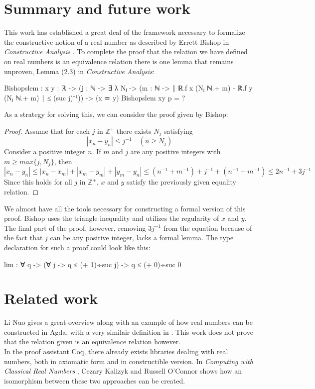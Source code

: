 \documentclass[11pt,a4paper]{article}
\begin{document}
\section{Summary and future work}
This work has established a great deal of the framework necessary to formalize the constructive notion of a real number as described by Errett Bishop in \textit{Constructive Analysis} \cite{bishop1985constructive}. To complete the proof that the relation we have defined on real numbers is an equivalence relation there is one lemma that remains unproven, Lemma (2.3) in \textit{Constructive Analysis}:
\begin{code}
Bishopslem : {x y : ℝ} -> 
           ({j : ℕ} -> ∃ λ Nⱼ -> ({m : ℕ} -> 
           ∣ ℝ.f x (Nⱼ ℕ.+ m) - ℝ.f y (Nⱼ ℕ.+ m) ∣ ≤ (suc j)⁻¹)) 
           -> (x ≃ y)
Bishopslem {x}{y} p = ?
\end{code}
As a strategy for solving this, we can consider the proof given by Bishop:
\begin{proof}
  Assume that for each $j$ in $\mathbb{Z}^+$ there exists $N_j$ satisfying\\
  \begin{equation*}
    | x_n - y_n | \leq j^{-1} \quad (n \geq N_j)
    \end{equation*}
  Consider a positive integer $n$. If $m$ and $j$ are any positive integers with $m \geq max\{j,N_j\}$, then
  \begin{equation*}
    |x_n - y_n| \leq |x_n - x_m| + |x_m - y_m| + |y_m - y_n| \leq (n^{-1} + m^{-1}) + j^{-1}+(n^{-1} + m^{-1})\le 2n^{-1}+3j^{-1}
  \end{equation*}
  Since this holds for all $j$ in $\mathbb{Z}^+$, $x$ and $y$ satisfy the previously given equality relation.
\end{proof}
We almost have all the tools necessary for constructing a formal version of this proof. Bishop uses the triangle inequality and utilizes the regularity of $x$ and $y$. The final part of the proof, however, removing $3j^{-1}$ from the equation because of the fact that $j$ can be any positive integer, lacks a formal lemma. The type declaration for such a proof could look like this:
\begin{code}
  lim : ∀ q -> (∀ j -> q ≤ (+ 1)÷suc j) -> q ≤ (+ 0)÷suc 0
\end{code}
\section{Related work}
Li Nuo gives a great overview along with an example of how real numbers can be constructed in Agda, with a very similair definition in \cite{nuo2010representing}. This work does not prove that the relation given is an equivalence relation however.\\
In the proof assistant Coq, there already exists libraries dealing with real numbers, both in axiomatic form and in constructible version. In \textit{Computing with Classical Real Numbers} \cite{kaliszyk2008computing}, Cezary Kalizyk and Russell O'Connor shows how an isomorphism between these two approaches can be created.
\end{document}
